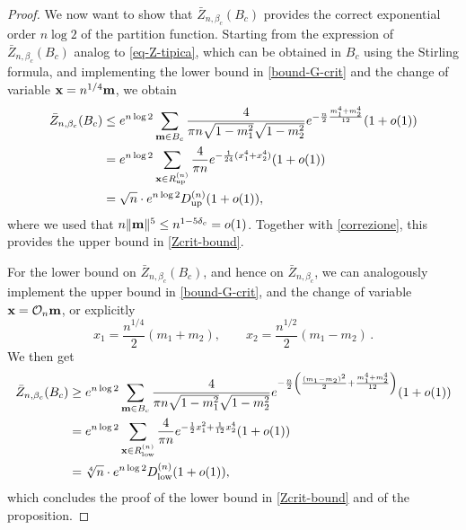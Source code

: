 \documentclass[11pt,oneside]{amsart}
\numberwithin{equation}{section}  %
\theoremstyle{plain}
\theoremstyle{remark}
\def \bm {{\bf m}}
\begin{document}
\begin{proof}
We now want to show that  $\bar{Z}_{n,\beta_c}(B_c)$ provides 
the correct exponential order $n\log 2$ of the partition function. Starting from the expression of $\bar{Z}_{n,\beta_c}(B_c)$ 
analog to \eqref{eq-Z-tipica}, which can be obtained in $B_c$
using the Stirling formula, and implementing the lower bound in \eqref{bound-G-crit}
and the change of variable ${\bf{x}}=n^{1/4}{\bf{m}}$, we obtain
\begin{equation*}
\begin{split}
    \bar{Z}_{n,\beta_c}(B_c)
    &\le e^{n\log 2} \sum_{\bm \in B_c} \frac{4}{\pi n \sqrt{1-m_1^2} \sqrt{1-m_2^2}}
    e^{-\frac{n}{2}\frac{m_1^4+m_2^4}{12}} (1+o(1))\\
    &=e^{n\log 2}\sum_{{\bf x} \in R_{\text{up}}^{(n)}} \frac{4}{\pi n} e^{-\frac{1}{24}(x_1^4+x_2^4)} (1+o(1)) \\
    &=\sqrt{n}\cdot e^{n\log 2} D_{\text{up}}^{(n)} (1+o(1)),
\end{split}
\end{equation*}
where we used that $n\|\bm\|^5\le n^{1-5\delta_c}=o(1)$. 
Together with \eqref{correzione}, this provides the upper bound in \eqref{Zcrit-bound}.

For the lower bound on  $\bar{Z}_{n,\beta_c}(B_c)$, and hence on $\bar{Z}_{n,\beta_c}$,
 we can analogously implement the upper bound in \eqref{bound-G-crit},  
 and the change of variable $\textbf{x}= \mathcal{O}_n\bm$, or explicitly
$$x_1= \frac{n^{1/4}}{2} (m_1+m_2),\qquad x_2= \frac{n^{1/2}}{2} (m_1-m_2)\,.$$
We then get
\begin{equation*}
\begin{split}
    \bar{Z}_{n,\beta_c}(B_c)
    &\ge e^{n\log 2} \sum_{\bm \in B_c} \frac{4}{\pi n \sqrt{1-m_1^2} \sqrt{1-m_2^2}}e^{-\frac{n}{2}\left(\frac{(m_1-m_2)^2}{2} + \frac{m_1^4+m_2^4}{12}\right)} (1+o(1))\\
    &=e^{n\log 2}\sum_{{\bf x} \in R_{\text{low}}^{(n)}} 
    \frac{4}{\pi n} e^{-\frac{1}{2}x_1^2+ \frac{1}{12}x_2^4} (1+o(1)) \\
    &=\sqrt[4]{n}\cdot e^{n\log 2} D_{\text{low}}^{(n)} (1+o(1)),
\end{split}
\end{equation*}
which concludes the proof of the lower bound in \eqref{Zcrit-bound} and 
of the proposition.
\end{proof}
\end{document}
